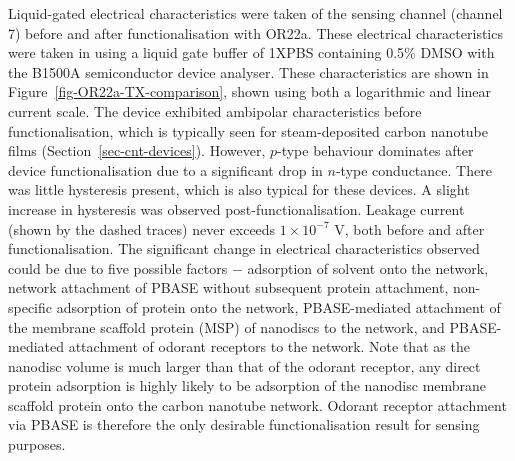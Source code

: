 \documentclass[
  a4paper,
]{scrbook}
\begin{document}
Liquid-gated electrical characteristics were taken of the sensing
channel (channel 7) before and after functionalisation with OR22a. These
electrical characteristics were taken in using a liquid gate buffer of
1XPBS containing 0.5\% DMSO with the B1500A semiconductor device
analyser. These characteristics are shown in
Figure~\ref{fig-OR22a-TX-comparison}, shown using both a logarithmic and
linear current scale. The device exhibited ambipolar characteristics
before functionalisation, which is typically seen for steam-deposited
carbon nanotube films (Section~\ref{sec-cnt-devices}). However,
\(p\)-type behaviour dominates after device functionalisation due to a
significant drop in \(n\)-type conductance. There was little hysteresis
present, which is also typical for these devices. A slight increase in
hysteresis was observed post-functionalisation. Leakage current (shown
by the dashed traces) never exceeds \(1 \times 10^{-7}\) V, both before
and after functionalisation. The significant change in electrical
characteristics observed could be due to five possible factors \(-\)
adsorption of solvent onto the network, network attachment of PBASE
without subsequent protein attachment, non-specific adsorption of
protein onto the network, PBASE-mediated attachment of the membrane
scaffold protein (MSP) of nanodiscs to the network, and PBASE-mediated
attachment of odorant receptors to the network. Note that as the
nanodisc volume is much larger than that of the odorant receptor, any
direct protein adsorption is highly likely to be adsorption of the
nanodisc membrane scaffold protein onto the carbon nanotube network.
Odorant receptor attachment via PBASE is therefore the only desirable
functionalisation result for sensing purposes.
\end{document}

